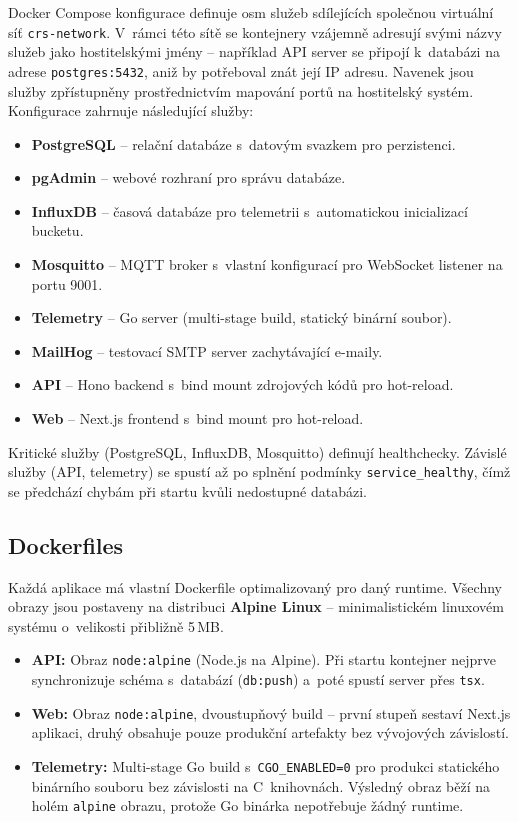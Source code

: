 Docker Compose konfigurace definuje osm služeb sdílejících společnou virtuální síť \texttt{crs-network}. V~rámci této sítě se kontejnery vzájemně adresují svými názvy služeb jako hostitelskými jmény -- například API server se připojí k~databázi na adrese \texttt{postgres:5432}, aniž by potřeboval znát její IP adresu. Navenek jsou služby zpřístupněny prostřednictvím mapování portů na hostitelský systém. Konfigurace zahrnuje následující služby:

\begin{itemize}
    \item \textbf{PostgreSQL} -- relační databáze s~datovým svazkem pro perzistenci.
    \item \textbf{pgAdmin} -- webové rozhraní pro správu databáze.
    \item \textbf{InfluxDB} -- časová databáze pro telemetrii s~automatickou inicializací bucketu.
    \item \textbf{Mosquitto} -- MQTT broker s~vlastní konfigurací pro WebSocket listener na portu 9001.
    \item \textbf{Telemetry} -- Go server (multi-stage build, statický binární soubor).
    \item \textbf{MailHog} -- testovací SMTP server zachytávající e-maily.
    \item \textbf{API} -- Hono backend s~bind mount zdrojových kódů pro hot-reload.
    \item \textbf{Web} -- Next.js frontend s~bind mount pro hot-reload.
\end{itemize}

Kritické služby (PostgreSQL, InfluxDB, Mosquitto) definují healthchecky. Závislé služby (API, telemetry) se spustí až po splnění podmínky \texttt{service\_healthy}, čímž se předchází chybám při startu kvůli nedostupné databázi.

\subsection{Dockerfiles}

Každá aplikace má vlastní Dockerfile optimalizovaný pro daný runtime. Všechny obrazy jsou postaveny na distribuci \textbf{Alpine Linux} -- minimalistickém linuxovém systému o~velikosti přibližně 5\,MB.

\begin{itemize}
    \item \textbf{API:} Obraz \texttt{node:alpine} (Node.js na Alpine). Při startu kontejner nejprve synchronizuje schéma s~databází (\texttt{db:push}) a~poté spustí server přes \texttt{tsx}.
    \item \textbf{Web:} Obraz \texttt{node:alpine}, dvoustupňový build -- první stupeň sestaví Next.js aplikaci, druhý obsahuje pouze produkční artefakty bez vývojových závislostí.
    \item \textbf{Telemetry:} Multi-stage Go build s~\texttt{CGO\_ENABLED=0} pro produkci statického binárního souboru bez závislosti na C~knihovnách. Výsledný obraz běží na holém \texttt{alpine} obrazu, protože Go binárka nepotřebuje žádný runtime.
\end{itemize}

